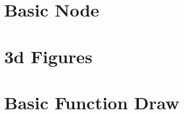 \documentclass{article}
\begin{document}

\section{Basic Node}


\section{3d Figures}


\section{Basic Function Draw}

\end{document}
